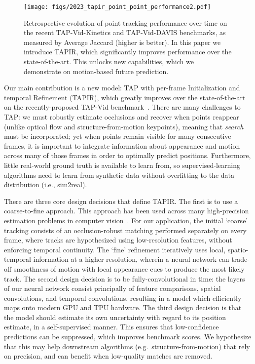 \documentclass[10pt,twocolumn,letterpaper]{article}
\begin{document}
\begin{figure}[t]
\begin{center}
\texttt{[image: figs/2023\_tapir\_point\_point\_performance2.pdf]}
\end{center}
   \caption{Retrospective evolution of point tracking performance over time on the recent TAP-Vid-Kinetics and TAP-Vid-DAVIS benchmarks, as measured by Average Jaccard (higher is better). In this paper we introduce TAPIR, which significantly improves performance over the state-of-the-art. This unlocks new capabilities, which we demonstrate on motion-based future prediction.}
\label{fig:fig1}
\end{figure}


Our main contribution is a new model: TAP with per-frame Initialization and temporal Refinement (TAPIR), which greatly improves over the state-of-the-art on the recently-proposed TAP-Vid benchmark~\cite{doersch2022tap}.  There are many challenges to TAP: we must robustly estimate occlusions and recover when points reappear (unlike optical flow and structure-from-motion keypoints), meaning that \emph{search} must be incorporated; yet when points remain visible for many consecutive frames, it is important to integrate information about appearance and motion across many of those frames in order to optimally predict positions.
Furthermore, little real-world ground truth is available to learn from, so supervised-learning algorithms need to learn from synthetic data without overfitting to the data distribution (i.e., sim2real).   

There are three core design decisions that define TAPIR.  The first is to use a coarse-to-fine approach. This approach has been used across many high-precision estimation problems in computer vision~\cite{lipson2022coupled, carreira2016human, yin2019hierarchical, newcombe2011kinectfusion, zollhofer2014real, wang2019prnet, su2022zebrapose, lee2017desire, marchetti2020mantra}. For our application, 
the initial `coarse' tracking consists of an occlusion-robust matching performed separately on every frame, where tracks are hypothesized using low-resolution features, without enforcing temporal continuity.   The `fine' refinement iteratively  uses local, spatio-temporal information at a higher resolution, wherein a neural network can trade-off smoothness of motion with local appearance cues to produce the most likely track.  The second design decision is to be fully-convolutional in time: the layers of our neural network consist principally of feature comparisons, spatial convolutions, and temporal convolutions, resulting in a model which efficiently maps onto modern GPU and TPU hardware.  The third design decision is that the model should estimate its own uncertainty with regard to its position estimate, in a self-supervised manner.  This ensures that low-confidence predictions can be suppressed, which improves benchmark scores.  We hypothesize that this may help downstream algorithms (e.g.\ structure-from-motion) that rely on precision, and can benefit when low-quality matches are removed.
\end{document}
